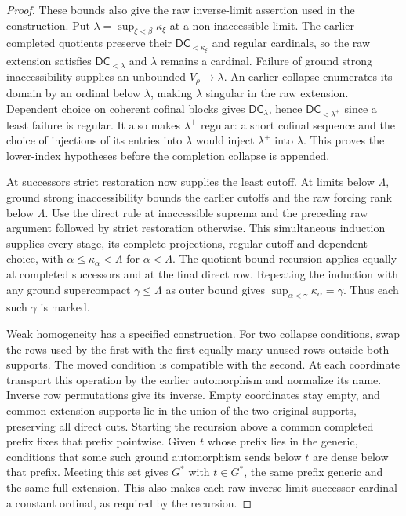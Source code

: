 \documentclass[11pt,a4paper]{amsart}
\newcommand{\DC}{\mathsf{DC}}
\theoremstyle{plain}
\theoremstyle{definition}
\theoremstyle{remark}
\begin{document}
\begin{proof}
These bounds also give the raw inverse-limit assertion used in
the construction.  Put $\lambda=\sup_{\xi<\beta}\kappa_\xi$ at a
non-inaccessible limit.  The earlier completed quotients preserve
their $\DC_{<\kappa_\xi}$ and regular cardinals, so the raw
extension satisfies $\DC_{<\lambda}$ and $\lambda$ remains a
cardinal.  Failure of ground strong inaccessibility supplies an
unbounded $V_\rho\to\lambda$.  An earlier collapse enumerates its
domain by an ordinal below $\lambda$, making $\lambda$ singular
in the raw extension.  Dependent choice on coherent cofinal
blocks gives $\DC_\lambda$, hence $\DC_{<\lambda^+}$ since a
least failure is regular.  It also makes $\lambda^+$ regular:
a short cofinal sequence and the choice of injections of its
entries into $\lambda$ would inject $\lambda^+$ into $\lambda$.
This proves the lower-index hypotheses before the completion
collapse is appended.

At successors strict restoration now supplies the least cutoff.
At limits below $\Lambda$, ground strong inaccessibility bounds
the earlier cutoffs and the raw forcing rank below $\Lambda$.
Use the direct rule at inaccessible suprema and the preceding
raw argument followed by strict restoration otherwise.
This simultaneous induction supplies every stage, its complete
projections, regular cutoff and dependent choice, with
$\alpha\leq\kappa_\alpha<\Lambda$ for $\alpha<\Lambda$.
The quotient-bound recursion applies equally at completed
successors and at the final direct row.  Repeating the induction
with any ground supercompact $\gamma\leq\Lambda$ as outer bound
gives $\sup_{\alpha<\gamma}\kappa_\alpha=\gamma$.
Thus each such $\gamma$ is marked.

Weak homogeneity has a specified construction.  For two collapse
conditions, swap the rows used by the first with the first equally
many unused rows outside both supports.  The moved condition is
compatible with the second.  At each coordinate transport this
operation by the earlier automorphism and normalize its name.
Inverse row permutations give its inverse.  Empty coordinates
stay empty, and common-extension supports lie in the union of
the two original supports, preserving all direct cuts.
Starting the recursion above a common completed prefix fixes
that prefix pointwise.  Given $t$ whose prefix lies in the
generic, conditions that some such ground automorphism sends
below $t$ are dense below that prefix.  Meeting this set gives
$G^*$ with $t\in G^*$, the same prefix generic and the same full
extension.  This also makes each raw inverse-limit successor
cardinal a constant ordinal, as required by the recursion.


\end{proof}
\end{document}
